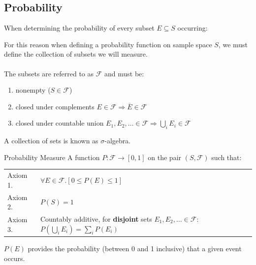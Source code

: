\subsection{Probability}
When determining the probability of every subset $E \subseteq S$ occurring:
\begin{itemize}
\end{itemize}
For this reason when defining a probability function on sample space $S$, we must define the collection of subsets we will measure.
\\
\\ The subsets are referred to as $\mathcal{F}$ and must be:
\begin{enumerate}
	\item nonempty ($S \in \mathcal{F}$)
	\item closed under complements $E \in \mathcal{F} \Rightarrow \overline{E} \in \mathcal{F}$
	\item closed under countable union $E_1, E_2, \dots \in \mathcal{F} \Rightarrow \bigcup_iE_i \in \mathcal{F}$
\end{enumerate}
A collection of sets is known as $\sigma$-algebra.
\begin{definitionbox}{Probability Measure}
	A function $P: \mathcal{F} \to [0,1]$ on the pair $(S,\mathcal{F})$ such that:
	\begin{center}
		\begin{tabular}{l l}
			Axiom 1. & $\forall E \in \mathcal{F}.[0 \leq P(E) \leq 1]$                                                                   \\
			Axiom 2. & $P(S) = 1$                                                                                                         \\
			Axiom 3. & Countably additive, for \textbf{disjoint} sets $E_1, E_2, \dots \in \mathcal{F}$: $P(\bigcup_iE_i) = \sum_iP(E_i)$
		\end{tabular}
	\end{center}
	$P(E)$ provides the probability (between 0 and 1 inclusive) that a given event occurs.
\end{definitionbox}

